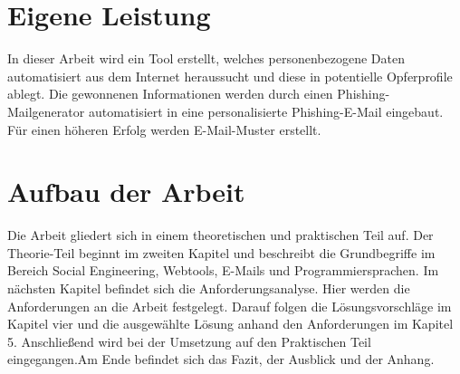 \section{Eigene Leistung}
\label {sec:Leistung} 
In dieser Arbeit wird ein Tool erstellt, welches personenbezogene Daten automatisiert aus dem Internet heraussucht und diese in potentielle Opferprofile ablegt. Die gewonnenen Informationen werden durch einen Phishing-Mailgenerator automatisiert in eine personalisierte Phishing-E-Mail eingebaut. Für einen höheren Erfolg werden E-Mail-Muster erstellt.

\section{Aufbau der Arbeit}
\label {sec:Aufbau} 
Die Arbeit gliedert sich in einem theoretischen und praktischen Teil auf. Der Theorie-Teil beginnt im zweiten Kapitel und beschreibt die Grundbegriffe im Bereich Social Engineering, Webtools, E-Mails und Programmiersprachen. Im nächsten Kapitel befindet sich die Anforderungsanalyse. Hier werden die Anforderungen an die Arbeit festgelegt. Darauf folgen die Lösungsvorschläge im Kapitel vier und die ausgewählte Lösung anhand den Anforderungen im Kapitel 5. Anschließend wird bei der Umsetzung auf den Praktischen Teil eingegangen.Am Ende befindet sich das Fazit, der Ausblick und der Anhang.






